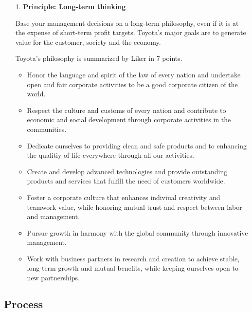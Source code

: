 \documentclass[11pt,a4paper]{article}
\begin{document}
\begin{enumerate}
\item[1.] \textbf{Principle: Long-term thinking}
  
  Base your management decisions on a long-term philosophy, even if it is at
  the expense of short-term profit targets. Toyota's major goals are to
  generate value for the customer, society and the economy.

  Toyota's philosophy is summarized by Liker in 7 points.
  \begin{itemize}
  \item Honor the language and spirit of the law of every nation and undertake
    open and fair corporate activities to be a good corporate citizen of the
    world.
  \item Respect the culture and customs of every nation and contribute to
    economic and social development through corporate activities in the
    communities.
  \item Dedicate ourselves to providing clean and safe products and to
    enhancing the qualitiy of life everywhere through all our activities.
  \item Create and develop advanced technologies and provide outstanding
    products and services that fulfill the need of customers worldwide.
  \item Foster a corporate culture that enhances indiviual creativity and
    teamwork value, while honoring mutual trust and respect between labor and
    management.
  \item Pursue growth in harmony with the global community through innovative
    management.
  \item Work with business partners in research and creation to achieve
    stable, long-term growth and mutual benefits, while keeping ourselves open
    to new partnerships.
  \end{itemize}  
\end{enumerate}

\subsection{Process}
\end{document}
